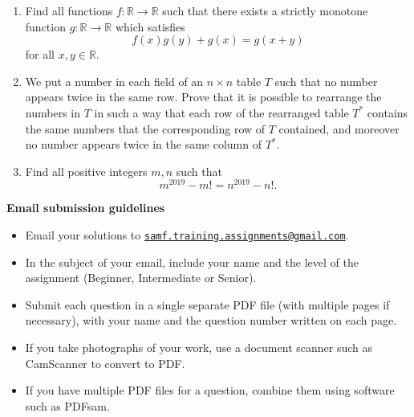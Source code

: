 \documentclass{article}
\begin{document}
\begin{enumerate}[1.]
\vspace{6pt}
\item %
Find all functions $f : \mathbb{R} \to \mathbb{R}$ such that there exists a strictly monotone function $g : \mathbb{R} \to \mathbb{R}$ which satisfies
\[ f(x)g(y) + g(x) = g(x+y) \]
for all $x, y \in \mathbb{R}$.


\vspace{6pt}
\item %
We put a number in each field of an $n \times n$ table $T$ such that no number appears twice in the same row. Prove that it is possible to rearrange the numbers in $T$ in such a way that each row of the rearranged table $T^*$ contains the same numbers that the corresponding row of $T$ contained, and moreover no number appears twice in the same column of $T^*$.


\vspace{6pt}
\item %
Find all positive integers $m, n$ such that
\[ m^{2019} - m! = n^{2019} - n! . \]

\end{enumerate}


\vfill
\textbf{\Large Email submission guidelines}
\begin{itemize}
	\item Email your solutions to \href{mailto:samf.training.assignments@gmail.com}{\texttt{samf.training.assignments@gmail.com}}.
	\item In the subject of your email, include your name and the level of the assignment (Beginner, Intermediate or Senior).
	\item Submit each question in a single separate PDF file (with multiple pages if necessary), with your name and the question number written on each page.
	\item If you take photographs of your work, use a document scanner such as CamScanner to convert to PDF.
	\item If you have multiple PDF files for a question, combine them using software such as PDFsam.
\end{itemize}
\end{document}
